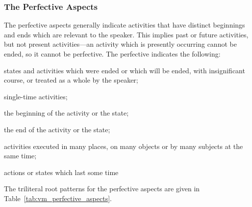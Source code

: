 \documentclass[grammar]{subfiles}
\begin{document}
  \subsubsection{The Perfective Aspects}
  \label{sssec:vm_perfective}

  The perfective aspects generally indicate activities that have distinct beginnings and ends which are relevant to the speaker. This implies past or future activities, but not present activities—an activity which is presently occurring cannot be ended, so it cannot be perfective. The perfective indicates the following:

  \begin{itemize*}
    \item states and activities which were ended or which will be ended, with insignificant course, or treated as a whole by the speaker;
    \item single-time activities;
    \item the beginning of the activity or the state;
    \item the end of the activity or the state;
    \item activities executed in many places, on many objects or by many subjects at the same time;
    \item actions or states which last some time
  \end{itemize*}

  The triliteral root patterns for the perfective aspects are given in Table~\ref{tab:vm_perfective_aspects}.
\end{document}
